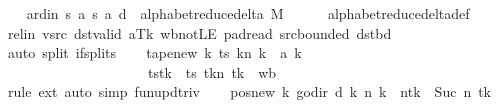 \begin{isabellebody}
\ \ \isamarkupfalse%
\ ard{\isacharunderscore}{\kern0pt}in{\isacharcolon}{\kern0pt}\ {\isachardoublequoteopen}{\isacharparenleft}{\kern0pt}{\isacharquery}{\kern0pt}s{\isacharcomma}{\kern0pt}\ {\isacharquery}{\kern0pt}a{\isacharcomma}{\kern0pt}\ {\isacharquery}{\kern0pt}s{\isacharprime}{\kern0pt}{\isacharcomma}{\kern0pt}\ {\isacharquery}{\kern0pt}a{\isacharprime}{\kern0pt}{\isacharcomma}{\kern0pt}\ {\isacharquery}{\kern0pt}d{\isacharparenright}{\kern0pt}\ {\isasymin}\ alphabet{\isacharunderscore}{\kern0pt}reduce{\isacharunderscore}{\kern0pt}delta\ M{\isachardoublequoteclose}\isanewline
\ \ \ \ \isamarkupfalse%
\ alphabet{\isacharunderscore}{\kern0pt}reduce{\isacharunderscore}{\kern0pt}delta{\isacharunderscore}{\kern0pt}def\isanewline
\ \ \ \ \isamarkupfalse%
\ rel{\isacharunderscore}{\kern0pt}in\ vsrc\ dst{\isacharunderscore}{\kern0pt}valid\ aTk\ wb{\isacharunderscore}{\kern0pt}not{\isacharunderscore}{\kern0pt}LE\ pad{\isacharunderscore}{\kern0pt}read\ src{\isacharunderscore}{\kern0pt}bounded\ dst{\isacharunderscore}{\kern0pt}bd\isanewline
\ \ \ \ \isamarkupfalse%
\ {\isacharparenleft}{\kern0pt}auto\ split{\isacharcolon}{\kern0pt}\ if{\isacharunderscore}{\kern0pt}splits{\isacharparenright}{\kern0pt}\isanewline
\ \ \isamarkupfalse%
\ tape{\isacharunderscore}{\kern0pt}new{\isacharcolon}{\kern0pt}\ {\isachardoublequoteopen}{\isacharparenleft}{\kern0pt}{\isasymlambda}k{\isachardot}{\kern0pt}\ {\isacharparenleft}{\kern0pt}ts\ k{\isacharparenright}{\kern0pt}{\isacharparenleft}{\kern0pt}n\ k\ {\isacharcolon}{\kern0pt}{\isacharequal}{\kern0pt}\ {\isacharquery}{\kern0pt}a{\isacharprime}{\kern0pt}\ k{\isacharparenright}{\kern0pt}{\isacharparenright}{\kern0pt}\isanewline
\ \ \ \ \ \ \ \ \ \ \ \ \ \ \ \ \ \ \ \ {\isacharequal}{\kern0pt}\ ts{\isacharparenleft}{\kern0pt}tk\ {\isacharcolon}{\kern0pt}{\isacharequal}{\kern0pt}\ {\isacharparenleft}{\kern0pt}ts\ tk{\isacharparenright}{\kern0pt}{\isacharparenleft}{\kern0pt}n\ tk\ {\isacharcolon}{\kern0pt}{\isacharequal}{\kern0pt}\ {\isacharquery}{\kern0pt}wb{\isacharparenright}{\kern0pt}{\isacharparenright}{\kern0pt}{\isachardoublequoteclose}\isanewline
\ \ \ \ \isamarkupfalse%
\ {\isacharparenleft}{\kern0pt}rule\ ext{\isacharparenright}{\kern0pt}\ {\isacharparenleft}{\kern0pt}auto\ simp{\isacharcolon}{\kern0pt}\ fun{\isacharunderscore}{\kern0pt}upd{\isacharunderscore}{\kern0pt}triv{\isacharparenright}{\kern0pt}\isanewline
\ \ \isamarkupfalse%
\ pos{\isacharunderscore}{\kern0pt}new{\isacharcolon}{\kern0pt}\ {\isachardoublequoteopen}{\isacharparenleft}{\kern0pt}{\isasymlambda}k{\isachardot}{\kern0pt}\ go{\isacharunderscore}{\kern0pt}dir\ {\isacharparenleft}{\kern0pt}{\isacharquery}{\kern0pt}d\ k{\isacharparenright}{\kern0pt}\ {\isacharparenleft}{\kern0pt}n\ k{\isacharparenright}{\kern0pt}{\isacharparenright}{\kern0pt}\ {\isacharequal}{\kern0pt}\ n{\isacharparenleft}{\kern0pt}tk\ {\isacharcolon}{\kern0pt}{\isacharequal}{\kern0pt}\ Suc\ {\isacharparenleft}{\kern0pt}n\ tk{\isacharparenright}{\kern0pt}{\isacharparenright}{\kern0pt}{\isachardoublequoteclose}\isanewline

\end{isabellebody}
